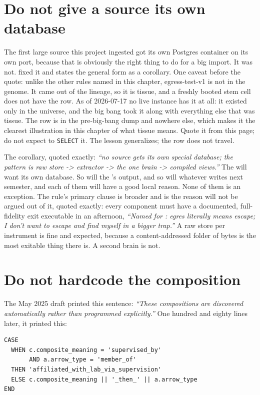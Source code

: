 \section{Do not give a source its own database}

The first large source this project ingested got its own Postgres container on its own port, because that is obviously the right thing to do for a big import. It was not.  fixed it and states the general form as a corollary. One caveat before the quote: unlike the other rules named in this chapter, egress-test-v1 is not in the genome. It came out of the \labLineageMedium{} lineage, so it is tissue, and a freshly booted stem cell does not have the row. As of 2026-07-17 no live instance has it at all: it existed only in the \labLineageName{} universe, and the big bang took it along with everything else that was tissue. The row is in the pre-big-bang dump and nowhere else, which makes it the clearest illustration in this chapter of what tissue means. Quote it from this page; do not expect to \texttt{SELECT} it. The lesson generalizes; the row does not travel.

The corollary, quoted exactly: \textit{``no source gets its own special database; the pattern is raw store -> extractor -> the one brain -> compiled views.''} The \labInstrument{} will want its own database. So will the \labColdSystemShort's \labFileFormat{} output, and so will whatever \labDAQ{} writes next semester, and each of them will have a good local reason. None of them is an exception. The rule's primary clause is broader and is the reason \labPI{} will not be argued out of it, quoted exactly: every component must have a documented, full-fidelity exit executable in an afternoon, \textit{``Named for \labPI{}: egres literally means escape; I don't want to escape and find myself in a bigger trap.''} A raw store per instrument is fine and expected, because a content-addressed folder of bytes is the most exitable thing there is. A second brain is not.

\section{Do not hardcode the composition}

The May 2025 draft printed this sentence: \textit{``These compositions are discovered automatically rather than programmed explicitly.''} One hundred and eighty lines later, it printed this:

\begin{lstlisting}
CASE
  WHEN c.composite_meaning = 'supervised_by'
       AND a.arrow_type = 'member_of'
  THEN 'affiliated_with_lab_via_supervision'
  ELSE c.composite_meaning || '_then_' || a.arrow_type
END
\end{lstlisting}

